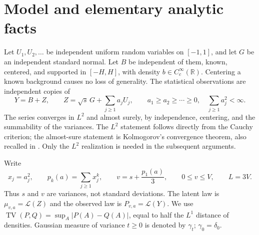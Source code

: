 \documentclass[11pt,letterpaper]{article}
\numberwithin{equation}{section}
\theoremstyle{definition}
\theoremstyle{remark}
\newcommand{\R}{\mathbb R}
\newcommand{\TV}{\operatorname{TV}}
\newcommand{\Law}{\mathcal L}
\begin{document}
\section{Model and elementary analytic facts}
\label{sec:model}

Let $U_1,U_2,\ldots$ be independent uniform random variables on $[-1,1]$,
and let $G$ be an independent standard normal. Let $B$ be independent of them,
known, centered, and supported in $[-H,H]$, with density
$b\in C_c^\infty(\R)$. Centering a known background causes no loss of generality.
The statistical observations are independent copies of
\begin{equation}
 Y=B+Z,\qquad Z=\sqrt{s}\,G+\sum_{j\ge1}a_jU_j,
 \qquad a_1\ge a_2\ge\cdots\ge0,
 \quad \sum_{j\ge1}a_j^2<\infty.
 \label{eq:model}
\end{equation}
The series converges in $L^2$ and almost surely, by independence, centering,
and the summability of the variances. The $L^2$ statement follows directly
from the Cauchy criterion; the almost-sure statement is Kolmogorov's
convergence theorem, also recalled in \cite[Theorem~3.9]{billey}.
Only the $L^2$ realization is needed in the subsequent arguments.

Write
\begin{equation}
 x_j=a_j^2,\qquad p_k(a)=\sum_{j\ge1}x_j^k,\qquad
 v=s+\frac{p_1(a)}3,\qquad 0\le v\le V,
 \qquad L=3V.
 \label{eq:notation}
\end{equation}
Thus $s$ and $v$ are variances, not standard deviations. The latent law is
$\mu_{v,a}=\Law(Z)$ and the observed law is $P_{v,a}=\Law(Y)$.
We use $\TV(P,Q)=\sup_A|P(A)-Q(A)|$, equal to half the $L^1$ distance of
densities. Gaussian measure of variance $t\ge0$ is denoted by $\gamma_t$;
$\gamma_0=\delta_0$.
\end{document}
